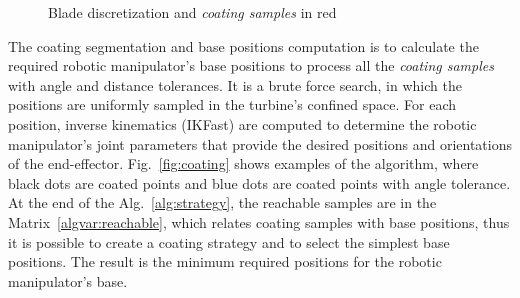 \begin{figure}
	\centering
	\quad
    \label{fig:discretization}
    \caption{Blade discretization and \textit{coating samples} in red}
\end{figure}

The coating segmentation and base positions computation is to calculate the
required robotic manipulator's base positions to process all the \textit{coating
samples} with angle and distance tolerances. It is a brute force search, in
which the positions are uniformly sampled in the turbine's confined space. For
each position, inverse kinematics (IKFast) are computed to determine the
robotic manipulator's joint parameters that provide the desired positions and
orientations of the end-effector. Fig.~\ref{fig:coating} shows examples of the
algorithm, where black dots are coated points and blue dots are coated points
with angle tolerance. At the end of the Alg.~\ref{alg:strategy}, the reachable
samples are in the Matrix~\ref{algvar:reachable}, which relates coating samples
with base positions, thus it is possible to create a coating strategy and to
select the simplest base positions. The result is the minimum required
positions for the robotic manipulator's base.

